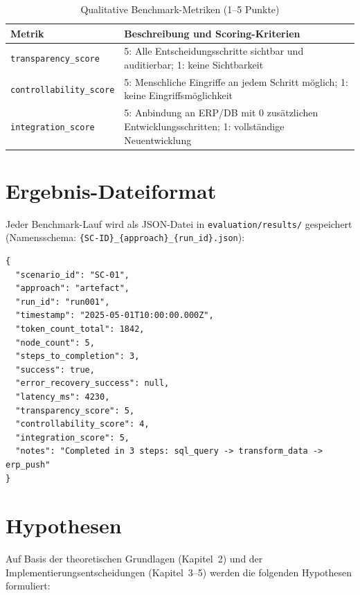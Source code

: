\documentclass[12pt,a4paper,oneside]{report}
\begin{document}
\begin{table}[H]
  \centering
  \caption{Qualitative Benchmark-Metriken (1--5 Punkte)}
  \label{tab:metrics-qual}
  \begin{tabularx}{\textwidth}{lX}
    \toprule
    \textbf{Metrik} & \textbf{Beschreibung und Scoring-Kriterien} \\
    \midrule
    \texttt{transparency\_score}
      & 5: Alle Entscheidungsschritte sichtbar und auditierbar; 1: keine Sichtbarkeit \\
    \texttt{controllability\_score}
      & 5: Menschliche Eingriffe an jedem Schritt möglich; 1: keine Eingriffsmöglichkeit \\
    \texttt{integration\_score}
      & 5: Anbindung an ERP/DB mit 0 zusätzlichen Entwicklungsschritten; 1: vollständige Neuentwicklung \\
    \bottomrule
  \end{tabularx}
\end{table}

\section{Ergebnis-Dateiformat}

Jeder Benchmark-Lauf wird als \ac{JSON}-Datei in \texttt{evaluation/results/}
gespeichert (Namensschema: \texttt{\{SC-ID\}\_\{approach\}\_\{run\_id\}.json}):

\begin{lstlisting}[caption={Beispiel-Ergebnisdatei SC-01\_artefact\_run001.json},
  label=lst:result-example]
{
  "scenario_id": "SC-01",
  "approach": "artefact",
  "run_id": "run001",
  "timestamp": "2025-05-01T10:00:00.000Z",
  "token_count_total": 1842,
  "node_count": 5,
  "steps_to_completion": 3,
  "success": true,
  "error_recovery_success": null,
  "latency_ms": 4230,
  "transparency_score": 5,
  "controllability_score": 4,
  "integration_score": 5,
  "notes": "Completed in 3 steps: sql_query -> transform_data -> erp_push"
}
\end{lstlisting}

\section{Hypothesen}

Auf Basis der theoretischen Grundlagen (Kapitel~2) und der Implementierungsentscheidungen
(Kapitel~3--5) werden die folgenden Hypothesen formuliert:
\end{document}
